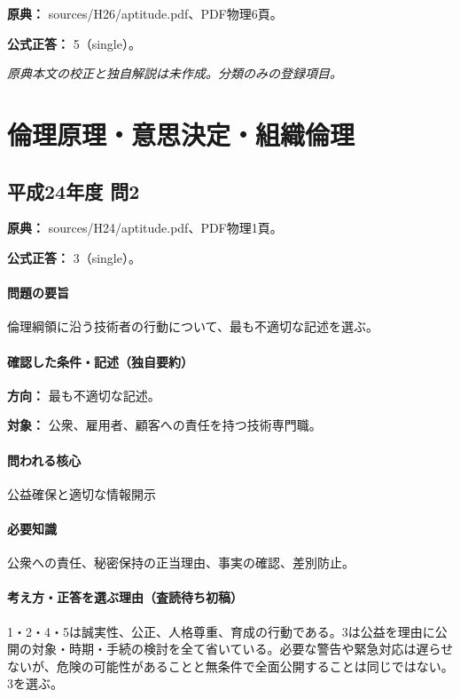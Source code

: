 \noindent\textbf{原典：} sources/H26/aptitude.pdf、PDF物理6頁。

\textbf{公式正答：} 5（single）。

\par\textit{原典本文の校正と独自解説は未作成。分類のみの登録項目。}

\section{倫理原理・意思決定・組織倫理}

\subsection{平成24年度 問2}
\label{q:h24-reg-apt-02}

\noindent\textbf{原典：} sources/H24/aptitude.pdf、PDF物理1頁。

\textbf{公式正答：} 3（single）。

\paragraph{問題の要旨} 倫理綱領に沿う技術者の行動について、最も不適切な記述を選ぶ。

\paragraph{確認した条件・記述（独自要約）}\mbox{}\par

\noindent\textbf{方向：} 最も不適切な記述。\par

\noindent\textbf{対象：} 公衆、雇用者、顧客への責任を持つ技術専門職。\par

\paragraph{問われる核心} 公益確保と適切な情報開示

\paragraph{必要知識} 公衆への責任、秘密保持の正当理由、事実の確認、差別防止。

\paragraph{考え方・正答を選ぶ理由（査読待ち初稿）} 1・2・4・5は誠実性、公正、人格尊重、育成の行動である。3は公益を理由に公開の対象・時期・手続の検討を全て省いている。必要な警告や緊急対応は遅らせないが、危険の可能性があることと無条件で全面公開することは同じではない。3を選ぶ。

